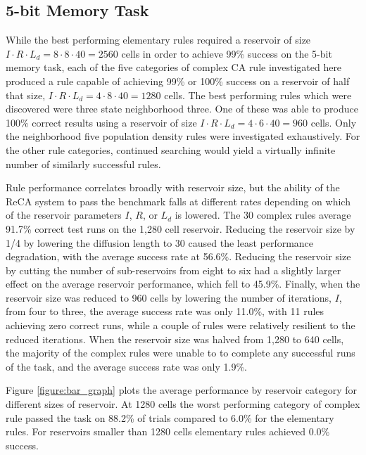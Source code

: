 \documentclass{elsarticle}
\begin{document}
\begin{multicols}{2}
\begin{figure}[H]
		\label{repeat}
	\end{figure}

	\subsection{5-bit Memory Task}
	While the best performing elementary rules required a reservoir of size $I \cdot R 
	\cdot L_{d} = 8 \cdot 8 \cdot 40 = 2560$ cells in order to achieve 99\% success on the 
	5-bit memory task, each of the five categories of complex CA rule investigated 
	here produced a rule capable of achieving 99\% or 100\% success on a reservoir 
	of half that size, $I \cdot R \cdot L_{d} = 4 \cdot 8 \cdot 40 = 1280$ cells. The best 
	performing rules which were discovered were three state neighborhood three. One of these 
	was able to produce 100\% correct results using a reservoir of size $I \cdot R \cdot 
	L_{d} = 4 \cdot 6 \cdot 40 = 960$ cells. Only the neighborhood five population density 
	rules were investigated exhaustively.  For the other rule categories, continued 
	searching would yield a virtually infinite number of similarly successful 
	rules. \par Rule performance correlates broadly with reservoir size, but the 
	ability of the ReCA system to  pass the benchmark falls at different rates 
	depending on which of the reservoir parameters $I$, $R$, or $L_{d}$ is lowered.  
	The 30 complex rules average 91.7\% correct test runs on the 1,280 cell 
	reservoir.  Reducing the reservoir size by 1/4 by lowering the diffusion length 
	to 30 caused the least performance degradation, with the average success rate 
	at 56.6\%. Reducing the reservoir size by cutting the number of sub-reservoirs 
	from eight to six had a slightly larger effect on the average reservoir 
	performance, which fell to 45.9\%.  Finally, when the reservoir size was 
	reduced to 960 cells by lowering the number of iterations, $I$, from four to 
	three, the average success rate was only 11.0\%, with 11 rules achieving zero 
	correct runs, while a  couple of rules were  relatively resilient to the 
	reduced iterations. When the reservoir size was halved from 1,280 to 640  
        cells, the majority of the complex rules were unable to to complete any 
        successful runs of the task, and the average success rate was only 
        1.9\%. \par Figure \ref{figure:bar_graph} plots the average performance 
        by reservoir category for different sizes of reservoir. At 1280 cells 
        the worst performing category of complex rule passed the task on 88.2\% 
        of trials compared to 6.0\% for the elementary rules. For reservoirs 
        smaller than 1280 cells elementary rules achieved 0.0\% success. 
	


\end{multicols}
\end{document}
